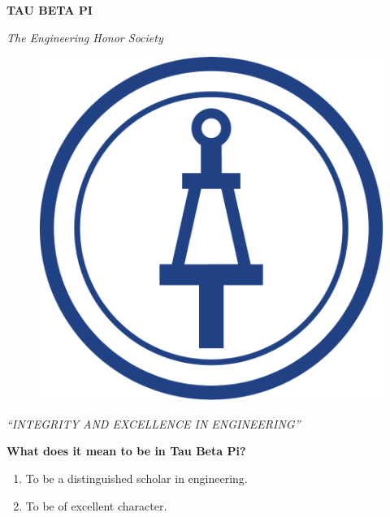 \documentclass[12pt]{extarticle}
\begin{document}
\begin{center}
{\Huge \textbf{TAU BETA PI}}
\end{center}

\begin{center}
{\large \textit{The Engineering Honor Society}}
\end{center}


\begin{figure}[h]
    \includegraphics[scale=0.6]{tbp-logo.png}
    \centering
\end{figure}

\begin{center}
{\Large \textit{``INTEGRITY AND EXCELLENCE IN ENGINEERING''}}
\end{center}

\bigskip
{\large \textbf{What does it mean to be in Tau Beta Pi?}}

\begin{enumerate}
    \item To be a distinguished scholar in engineering.
    \item To be of excellent character.
\end{enumerate}
\end{document}

